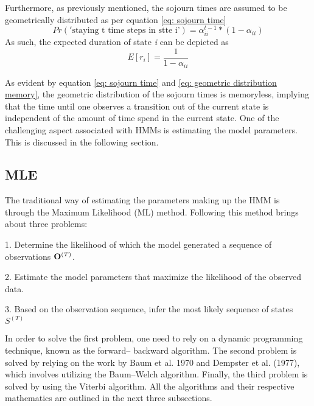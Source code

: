 Furthermore, as previously mentioned, the sojourn times are assumed to be geometrically distributed as per equation \ref{eq: sojourn time}
\begin{equation}
    Pr('\text{staying t time steps in stte i'}) = \alpha^{t-1}_{ii} *(1-\alpha_{ii})
    \label{eq: sojourn time}
\end{equation}
As such, the expected duration of state \textit{i} can be depicted as 
\begin{equation}
    E[r_i] = \frac{1}{1-\alpha_{ii}}
    \label{eq: geometric distribution memory}
\end{equation}

As evident by equation \ref{eq: sojourn time} and \ref{eq: geometric distribution memory}, the geometric distribution of the sojourn times is memoryless, implying that the time until one observes a transition out of the current state is independent of the amount of time spend in the current state. One of the challenging aspect associated with HMMs is estimating the model parameters. This is discussed in the following section.

\subsection{MLE}
The traditional way of estimating the parameters making up the HMM is through the Maximum Likelihood
(ML) method. Following this method brings about three problems:

    1. Determine the likelihood of which the model generated a sequence of  observations $\bold{O}^{(T)}$. 
    
    2. Estimate the model parameters that maximize the likelihood of the observed data.

    3. Based on the observation sequence, infer the most likely sequence of states $S^{(T)}$
\label{subsection: MLE}
 
In order to solve the first problem, one need to rely on a dynamic programming technique, known as the forward–
backward algorithm. The second problem is solved by relying on the work by Baum et al. 1970 and Dempster et al. (1977), which involves utilizing the Baum–Welch
algorithm. Finally, the third problem is solved by using the Viterbi algorithm. All the algorithms and their respective mathematics are outlined in the next three subsections. 
 
